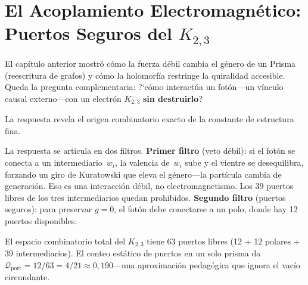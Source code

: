\documentclass[11pt, a4paper, openany]{book}
\begin{document}
\section{El Acoplamiento Electromagn\'etico: Puertos Seguros del $K_{2,3}$}
\label{sec:em-coupling}


El cap\'itulo anterior mostr\'o c\'omo la fuerza d\'ebil cambia el
g\'enero de un Prisma (reescritura de grafos) y c\'omo la holomorf\'ia
restringe la quiralidad accesible. Queda la pregunta complementaria:
?`c\'omo interact\'ua un fot\'on---un v\'inculo causal externo---con un
electr\'on $K_{2,3}$ \textbf{sin destruirlo}?

La respuesta revela el origen combinatorio exacto de la constante de
estructura fina.

La respuesta se articula en dos filtros. \textbf{Primer filtro} (veto
d\'ebil): si el fot\'on se conecta a un intermediario~$w_i$, la valencia
de~$w_i$ sube y el vientre se desequilibra, forzando un giro de
Kuratowski que eleva el g\'enero---la part\'icula cambia de
generaci\'on. Eso es una interacci\'on d\'ebil, no electromagnetismo.
Los 39 puertos libres de los tres intermediarios quedan prohibidos.
\textbf{Segundo filtro} (puertos seguros): para preservar $g = 0$, el
fot\'on debe conectarse a un polo, donde hay 12 puertos disponibles.

El espacio combinatorio total del $K_{2,3}$ tiene 63 puertos libres
(12 + 12 polares $+$ 39 intermediarios). El conteo est\'atico de
puertos en un solo prisma da
$\mathcal{Q}_{\mathrm{port}} = 12/63 = 4/21 \approx 0{,}190$---una
aproximaci\'on pedag\'ogica que ignora el vac\'io circundante.
\end{document}
